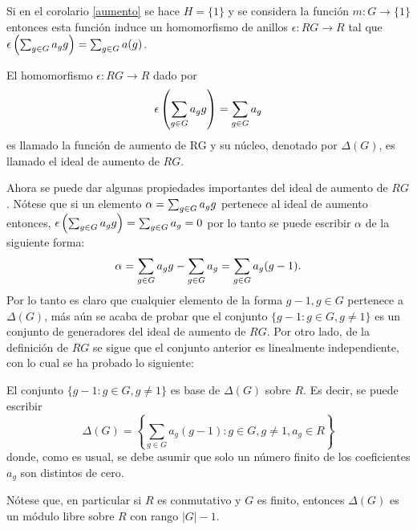 \begin{nota}
Si en el corolario \ref{aumento} se hace $H=\{1\}$ y se considera la función $m \colon G \to \{1\}$ entonces esta función induce un homomorfismo de anillos $\epsilon \colon RG \to R$ tal que $\epsilon\left(\sum_{g \in G} a_{g} g\right) = \sum_{g \in G} a(g)$. 
\end{nota}
\begin{definicion}
El homomorfismo $\epsilon \colon RG \to R$ dado por \[ \epsilon \left( \sum_{g \in G} a_{g} g\right) = \sum_{g \in G}a_g \] es llamado la función de aumento de RG y su núcleo, denotado por $\Delta (G)$, es llamado el ideal de aumento de $RG$.
\end{definicion}
Ahora se puede dar algunas propiedades importantes del ideal de aumento de $RG$. Nótese que si un elemento $\alpha = \sum_{g \in G} a_{g} g$ pertenece al ideal de aumento entonces, $ \epsilon \left( \sum_{g \in G} a_{g} g\right) = \sum_{g \in G}a_g = 0 $ por lo tanto se puede escribir $\alpha$ de la siguiente forma: 
\[\alpha = \sum_{g \in G} a_{g} g -\sum_{g \in G}a_g = \sum_{g \in G}a_g(g-1). \]
\indent Por lo tanto es claro que cualquier elemento de la forma $g-1, g \in G$ pertenece a $\Delta(G)$, más aún se acaba de probar que el conjunto $\{g-1 : g \in G, g \neq 1\}$ es un conjunto de generadores del ideal de aumento de $RG$. Por otro lado, de la definición de $RG$ se sigue que el conjunto anterior es linealmente independiente, con lo cual se ha probado lo siguiente:
\begin{proposicion} \label{gen}
El conjunto $\{ g-1 : g \in G , g \neq 1\}$ es base de $\Delta (G)$ sobre $R$. Es decir, se puede escribir
\begin{equation*}
\Delta (G) = \left\{ \sum_{g \in G} a_g(g-1) : g \in G , g \neq 1, a_g \in R \right\}
\end{equation*}
donde, como es usual, se debe asumir que solo un número finito de los coeficientes $a_g$ son distintos de cero.
\end{proposicion}
Nótese que, en particular si $R$ es conmutativo y $G$ es finito, entonces $\Delta (G)$ es un módulo libre sobre $R$ con rango $|G|-1$.


